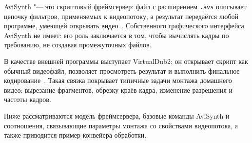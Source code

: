 AviSynth "--- это скриптовый фреймсервер: файл с расширением \texttt{.avs}
описывает цепочку фильтров, применяемых к видеопотоку, а результат
передаётся любой программе, умеющей открывать видео~\cite{avisynth}.
Собственного графического интерфейса AviSynth не имеет: его роль заключается
в том, чтобы вычислять кадры по требованию, не создавая промежуточных
файлов.

В качестве внешней программы выступает VirtualDub2: он открывает скрипт как
обычный видеофайл, позволяет просмотреть результат и выполнить финальное
кодирование~\cite{virtualdub}. Такая связка покрывает типичные задачи
монтажа домашнего видео: вырезание фрагментов, обрезку краёв кадра,
изменение разрешения и частоты кадров.

Ниже рассматриваются модель фреймсервера, базовые команды AviSynth
и соотношения, связывающие параметры монтажа со свойствами видеопотока,
а также приводится пример конвейера обработки.
